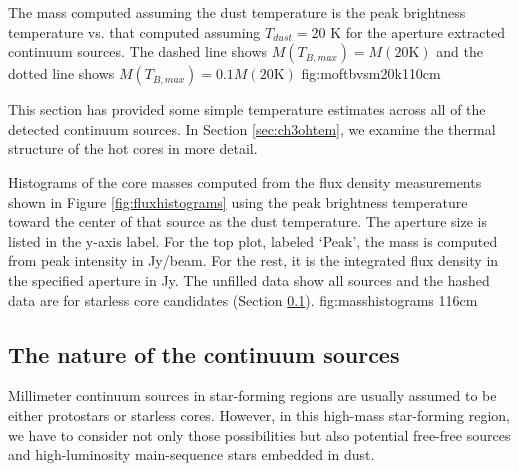\documentclass{emulateapj}
\begin{document}
{The mass computed assuming the dust temperature is the peak brightness
temperature vs. that computed assuming $T_{dust}=20$ K  for the aperture extracted
continuum sources.
The dashed line shows $M(T_{B,max}) =
M(20\textrm{K})$ and the dotted line shows $M(T_{B,max}) = 0.1 
M(20\textrm{K})$ 
}{fig:moftbvsm20k}{1}{10cm}

This section has provided some simple temperature estimates across all of the
detected continuum sources.  In Section \ref{sec:ch3ohtem}, we  examine
the thermal structure of the hot cores in more detail.



{Histograms of the core masses computed from the flux density measurements
shown in Figure \ref{fig:fluxhistograms} using the peak brightness temperature 
toward the center of that source as the dust temperature.
The aperture size is listed in the y-axis label.  For the top plot, labeled
`Peak', the mass is computed from peak
intensity in Jy/beam.  For the rest, it is the integrated flux density in
the specified aperture in Jy.  The unfilled data show all sources and the
hashed
data are for starless core candidates (Section \ref{sec:contsourcenature}).}
{fig:masshistograms}
{1}{16cm}

\subsection{The nature of the continuum sources}
\label{sec:contsourcenature}
Millimeter continuum sources in star-forming regions are usually assumed to be
either protostars or starless cores.  However, in this high-mass star-forming
region, we have to consider not only those possibilities but also potential
free-free sources and high-luminosity main-sequence stars embedded in dust.
\end{document}
